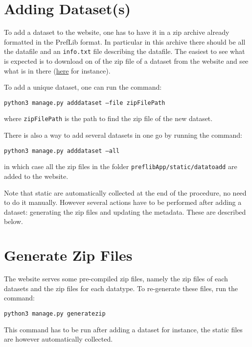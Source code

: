 \documentclass{report}
\begin{document}
	\section{Adding Dataset(s)}
	
	To add a dataset to the website, one has to have it in a zip archive already formatted in the PrefLib format. In particular in this archive there should be all the datafile and an \texttt{info.txt} file describing the datafile. The easiest to see what is expected is to download on of the zip file of a dataset from the website and see what is in there (\href{https://www.preflib.org/static/data/ED/irish/irish.zip}{here} for instance).
	
	To add a unique dataset, one can run the command:
	
	\begin{center}
		\texttt{python3 manage.py adddataset --file zipFilePath}
	\end{center}

	\noindent where \texttt{zipFilePath} is the path to find the zip file of the new dataset.
	
	There is also a way to add several datasets in one go by running the command:
	
	\begin{center}
		\texttt{python3 manage.py adddataset --all}
	\end{center}
	
	\noindent in which case all the zip files in the folder \texttt{preflibApp/static/datatoadd} are added to the website.
	
	Note that static are automatically collected at the end of the procedure, no need to do it manually. However several actions have to be performed after adding a dataset: generating the zip files and updating the metadata. These are described below.
	
	\section{Generate Zip Files}
	
	The website serves some pre-compiled zip files, namely the zip files of each datasets and the zip files for each datatype. To re-generate these files, run the command:
	
	\begin{center}
		\texttt{python3 manage.py generatezip}
	\end{center}

	This command has to be run after adding a dataset for instance, the static files are however automatically collected.
	
\end{document}

